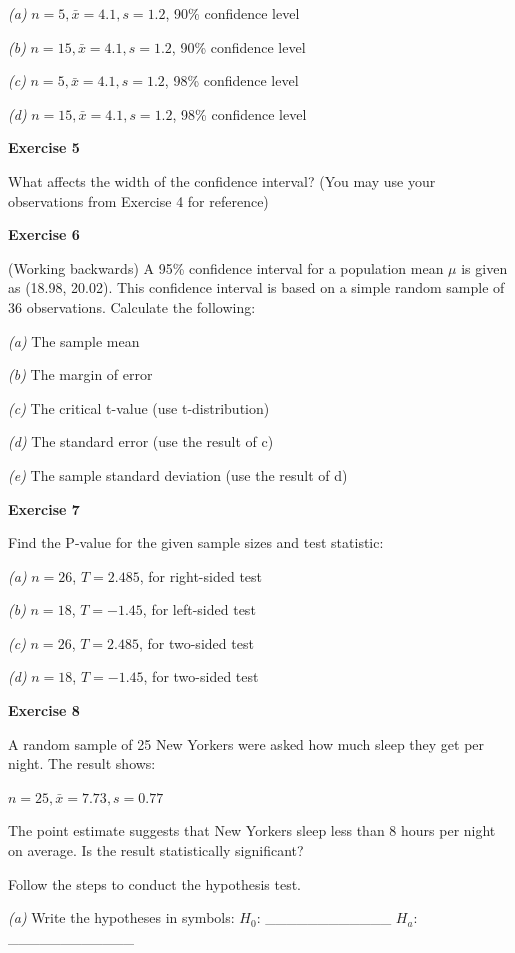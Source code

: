 \documentclass[
]{book}
\begin{document}
\emph{(a)} \(n=5, \bar{x}=4.1, s=1.2\), 90\% confidence level

\emph{(b)} \(n=15, \bar{x}=4.1, s=1.2\), 90\% confidence level

\emph{(c)} \(n=5, \bar{x}=4.1, s=1.2\), 98\% confidence level

\emph{(d)} \(n=15, \bar{x}=4.1, s=1.2\), 98\% confidence level

\textbf{Exercise 5}

What affects the width of the confidence interval? (You may use your observations from Exercise 4 for reference)

\textbf{Exercise 6}

(Working backwards) A 95\% confidence interval for a population mean \(\mu\) is given as (18.98, 20.02). This confidence interval is based on a simple random sample of 36 observations. Calculate the following:

\emph{(a)} The sample mean

\emph{(b)} The margin of error

\emph{(c)} The critical t-value (use t-distribution)

\emph{(d)} The standard error (use the result of c)

\emph{(e)} The sample standard deviation (use the result of d)

\textbf{Exercise 7}

Find the P-value for the given sample sizes and test statistic:

\emph{(a)} \(n=26\), \(T=2.485\), for right-sided test

\emph{(b)} \(n=18\), \(T=-1.45\), for left-sided test

\emph{(c)} \(n=26\), \(T=2.485\), for two-sided test

\emph{(d)} \(n=18\), \(T=-1.45\), for two-sided test

\textbf{Exercise 8}

A random sample of 25 New Yorkers were asked how much sleep they get per night. The result shows:

\(n=25, \bar{x}=7.73, s=0.77\)

The point estimate suggests that New Yorkers sleep less than 8 hours per night on average. Is the result statistically significant?

Follow the steps to conduct the hypothesis test.

\emph{(a)} Write the hypotheses in symbols: \(H_0\): \_\_\_\_\_\_\_\_\_\_\_\_ \(H_a\): \_\_\_\_\_\_\_\_\_\_\_\_
\end{document}
